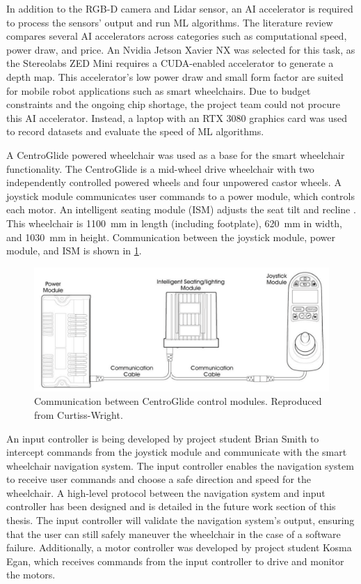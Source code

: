 In addition to the RGB-D camera and Lidar sensor, an AI accelerator is required to process the sensors'
output and run ML algorithms. The literature review compares several AI accelerators across categories
such as computational speed, power draw, and price. An Nvidia Jetson Xavier NX was selected for this task,
as the Stereolabs ZED Mini requires a CUDA-enabled accelerator to generate a depth map. This accelerator's
low power draw and small form factor are suited for mobile robot applications such as smart wheelchairs.
Due to budget constraints and the ongoing chip shortage, the project team could not procure this AI accelerator.
Instead, a laptop with an RTX 3080 graphics card was used to record datasets and evaluate the speed of
ML algorithms.

A CentroGlide powered wheelchair was used as a base for the smart wheelchair functionality.
The CentroGlide is a mid-wheel drive wheelchair with two independently controlled powered wheels and four
unpowered castor wheels.
A joystick module communicates user commands to a power module, which controls
each motor. An intelligent seating module (ISM) adjusts the seat tilt and recline \cite{glideCentroGlideOWNERUSER2022}.
This wheelchair is \SI{1100}{\milli\metre} in length (including footplate), \SI{620}{\milli\metre}
in width, and \SI{1030}{\milli\metre} in height.
Communication between the joystick module, power module, and ISM is shown in \cref{fig:module_communication}.

\begin{figure}[b]
    \centering
    \includegraphics[width=0.7\linewidth]{images/module_communication.png}
    \caption{Communication between CentroGlide control modules. Reproduced from Curtiss-Wright. \cite{curtiss-wrightPGDRIVESTECHNOLOGY2016}}
    \label{fig:module_communication}
\end{figure}

An input controller is being developed by project student Brian Smith to intercept
commands from the joystick module and communicate with the smart wheelchair navigation system.
The input controller enables the navigation system to receive user commands and choose a safe
direction and speed for the wheelchair.
A high-level protocol between the navigation system and input controller has been designed
and is detailed in the future work section of this thesis. The input controller will validate the
navigation system's output, ensuring that the user
can still safely maneuver the wheelchair in the case of a software failure.
Additionally, a motor controller was developed by project student
Kosma Egan, which receives commands from the input controller to drive and monitor the motors.
\pagebreak

